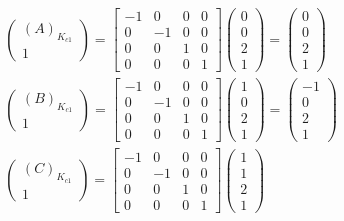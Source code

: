 \begin{gather}
	\begin{pmatrix}
		(A)_{K_{c1}}\\1
	\end{pmatrix}
	=
	\begin{bmatrix}
		-1&0&0&0\\
		0&-1&0&0\\
		0&0&1&0\\
		0&0&0&1
	\end{bmatrix}
	\begin{pmatrix}
		0\\0\\2\\1
	\end{pmatrix}
	=
	\begin{pmatrix}
		0\\0\\2\\1
	\end{pmatrix}\\
	\begin{pmatrix}
		(B)_{K_{c1}}\\1
	\end{pmatrix}
	=
	\begin{bmatrix}
		-1&0&0&0\\
		0&-1&0&0\\
		0&0&1&0\\
		0&0&0&1
	\end{bmatrix}
	\begin{pmatrix}
		1\\0\\2\\1
	\end{pmatrix}
	=
	\begin{pmatrix}
		-1\\0\\2\\1
	\end{pmatrix}\\
	\begin{pmatrix}
		(C)_{K_{c1}}\\1
	\end{pmatrix}
	=
	\begin{bmatrix}
		-1&0&0&0\\
		0&-1&0&0\\
		0&0&1&0\\
		0&0&0&1
	\end{bmatrix}
	\begin{pmatrix}
		1\\1\\2\\1

\end{pmatrix}
\end{gather}
